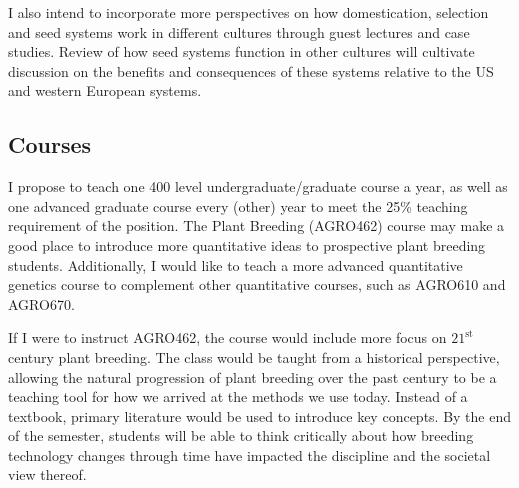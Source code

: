\documentclass[11pt]{article}
\begin{document}

I also intend to incorporate more perspectives on how domestication, selection and seed systems work in different cultures through guest lectures and case studies. Review of how seed systems function in other cultures will cultivate discussion on the benefits and consequences of these systems relative to the US and western European systems. 

\subsection*{Courses}

I propose to teach one 400 level undergraduate/graduate course a year, as well as one advanced graduate course every (other) year to meet the 25\% teaching requirement of the position. The Plant Breeding (AGRO462) course may make a good place to introduce more quantitative ideas to prospective plant breeding students. Additionally, I would like to teach a more advanced quantitative genetics course to complement other quantitative courses, such as AGRO610 and AGRO670.


If I were to instruct AGRO462, the course would include more focus on $21^\text{st}$ century plant breeding. The class would be taught from a historical perspective, allowing the natural progression of plant breeding over the past century to be a teaching tool for how we arrived at the methods we use today. Instead of a textbook, primary literature would be used to introduce key concepts. By the end of the semester, students will be able to think critically about how breeding technology changes through time have impacted the discipline and the societal view thereof. 
\end{document}
